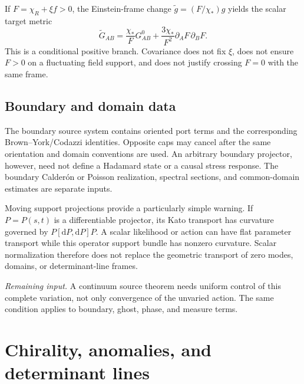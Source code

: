 \documentclass[11pt,a4paper,oneside]{book}
\theoremstyle{plain}
\theoremstyle{definition}
\theoremstyle{remark}
\newcommand{\dd}{\mathrm d}
\newcommand{\src}[2]{\cite{#1}}
\newcommand{\gate}[1]{\par\smallskip\noindent\textit{Remaining input.} #1\par\smallskip}
\begin{document}
If $F=\chi_R+\xi f>0$, the Einstein-frame change $\widetilde g=(F/\chi_*)g$ yields the scalar target metric
\begin{equation}
 \widetilde G_{AB}=\frac{\chi_*}{F}G^0_{AB}
 +\frac{3\chi_*}{F^2}\partial_AF\,\partial_BF.
 \label{eq:einstein-frame}
\end{equation}
This is a conditional positive branch. Covariance does not fix $\xi$, does not ensure $F>0$ on a fluctuating field support, and does not justify crossing $F=0$ with the same frame.

\section{Boundary and domain data}
The boundary source system contains oriented port terms and the corresponding Brown--York/Codazzi identities. Opposite caps may cancel after the same orientation and domain conventions are used. An arbitrary boundary projector, however, need not define a Hadamard state or a causal stress response. The boundary Calder\'on or Poisson realization, spectral sections, and common-domain estimates are separate inputs.

Moving support projections provide a particularly simple warning. If $P=P(s,t)$ is a differentiable projector, its Kato transport has curvature governed by $P[\dd P,\dd P]P$. A scalar likelihood or action can have flat parameter transport while this operator support bundle has nonzero curvature. Scalar normalization therefore does not replace the geometric transport of zero modes, domains, or determinant-line frames. \src{R1}{thm:V119-Kato-transport,prop:V119-GM-versus-Kato}

\gate{A continuum source theorem needs uniform control of this complete variation, not only convergence of the unvaried action. The same condition applies to boundary, ghost, phase, and measure terms.}


\chapter{Chirality, anomalies, and determinant lines}
\label{ch:chiral}
\end{document}
